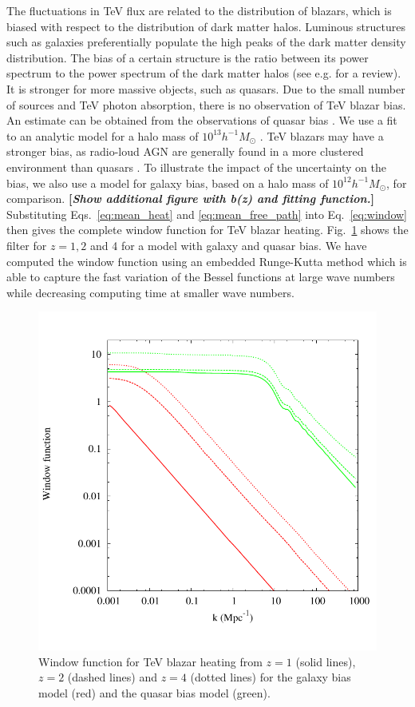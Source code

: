\documentclass[twocolumns]{emulateapj}
\newcommand\Cc[1]{{\color{blue} \bf #1}} %
\begin{document}
The fluctuations in TeV flux are related to the distribution of blazars, which is biased with respect to the distribution of dark matter halos. Luminous structures such as galaxies preferentially populate the high peaks of the dark matter density distribution. The bias of a certain structure is the ratio between its power spectrum to the power spectrum of the dark matter halos (see e.g. \citet{2002PhR...372....1C} for a review). It is stronger for more massive objects, such as quasars.
Due to the small number of sources and TeV photon absorption, there is no observation of TeV blazar bias. An estimate can be obtained from the observations of quasar bias \citep{2005MNRAS.356..415C,2007ApJ...658...85M,2007AJ....133.2222S}. We use a fit to an analytic model for a halo mass of $10^{13}h^{-1}M_{\odot}$ \citep{2008ApJ...678..627B}. TeV blazars may have a stronger bias, as radio-loud AGN are generally found in a more clustered environment than quasars \citep{2009MNRAS.393..377M,2012MNRAS.421.3060S}. To illustrate the impact of the uncertainty on the bias, we also use a model for galaxy bias, based on a halo mass of $10^{12}h^{-1} M_{\odot}$, for comparison.
\Cc{[{\em Show additional figure with b(z) and fitting function.}]}
Substituting Eqs.~\eqref{eq:mean_heat} and \ref{eq:mean_free_path} into Eq.~\eqref{eq:window} then gives the complete window function for TeV blazar heating. Fig.~\ref{fig:window} shows the filter for $z=1,2$ and 4 for a model with galaxy and quasar bias. We have computed the window function using an embedded Runge-Kutta method which is able to capture the fast variation of the Bessel functions at large wave numbers while decreasing computing time at smaller wave numbers.
\begin{figure}[h]
\centering
\includegraphics[width = .45\textwidth ]{window_gal_qso-eps-converted-to}
\caption{Window function for TeV blazar heating from $z=1$ (solid lines), $z=2$ (dashed lines) and $z=4$ (dotted lines) for the galaxy bias model (red) and the quasar bias model (green).}
\label{fig:window}
\end{figure}
\end{document}
